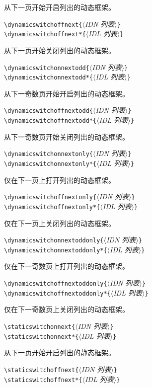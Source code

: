 \documentclass[a4paper]{book}%
\newcommand{\meta}[1]{\textnormal{\ensuremath{\langle}\makebox[0pt][l]{}\emph{#1}\makebox[0pt][l]{}\ensuremath{\rangle}}}
\begin{document}
从下一页开始开启列出的动态框架。
\begin{mdframed}
    \verb|\dynamicswitchoffnext{|\meta{IDN 列表}\verb|}|\\
    \verb|\dynamicswitchoffnext*{|\meta{IDL 列表}\verb|}|
\end{mdframed}
从下一页开始关闭列出的动态框架。
\begin{mdframed}
    \verb|\dynamicswitchonnextodd{|\meta{IDN 列表}\verb|}|\\
    \verb|\dynamicswitchonnextodd*{|\meta{IDL 列表}\verb|}|
\end{mdframed}
从下一奇数页开始开启列出的动态框架。
\begin{mdframed}
    \verb|\dynamicswitchoffnextodd{|\meta{IDN 列表}\verb|}|\\
    \verb|\dynamicswitchoffnextodd*{|\meta{IDL 列表}\verb|}|
\end{mdframed}
从下一奇数页开始关闭列出的动态框架。
\begin{mdframed}
    \verb|\dynamicswitchonnextonly{|\meta{IDN 列表}\verb|}|\\
    \verb|\dynamicswitchonnextonly*{|\meta{IDL 列表}\verb|}|
\end{mdframed}
仅在下一页上打开列出的动态框架。
\begin{mdframed}
    \verb|\dynamicswitchoffnextonly{|\meta{IDN 列表}\verb|}|\\
    \verb|\dynamicswitchoffnextonly*{|\meta{IDL 列表}\verb|}|
\end{mdframed}
仅在下一页上关闭列出的动态框架。
\begin{mdframed}
    \verb|\dynamicswitchonnextoddonly{|\meta{IDN 列表}\verb|}|\\
    \verb|\dynamicswitchonnextoddonly*{|\meta{IDL 列表}\verb|}|
\end{mdframed}
仅在下一奇数页上打开列出的动态框架。
\begin{mdframed}
    \verb|\dynamicswitchoffnextoddonly{|\meta{IDN 列表}\verb|}|\\
    \verb|\dynamicswitchoffnextoddonly*{|\meta{IDL 列表}\verb|}|
\end{mdframed}
仅在下一奇数页上关闭列出的动态框架。
\begin{mdframed}
    \verb|\staticswitchonnext{|\meta{IDN 列表}\verb|}|\\
    \verb|\staticswitchonnext*{|\meta{IDL 列表}\verb|}|
\end{mdframed}
从下一页开始开启列出的静态框架。
\begin{mdframed}
    \verb|\staticswitchoffnext{|\meta{IDN 列表}\verb|}|\\
    \verb|\staticswitchoffnext*{|\meta{IDL 列表}\verb|}|
\end{mdframed}
\end{document}

